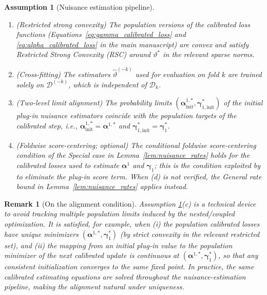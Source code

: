 \documentclass{article}
\newtheorem{assumption}{Assumption}[section]
\newtheorem{remark}{Remark}[section]
\begin{document}
\begin{assumption}[Nuisance estimation pipeline]\label{asmp:rsc}
\begin{enumerate}[label={(\alph*)},leftmargin=*]
    \item (Restricted strong convexity) The population versions of the calibrated loss functions (Equations~\eqref{eq:gamma_calibrated_loss} and \eqref{eq:alpha_calibrated_loss} in the main manuscript) are convex and satisfy Restricted Strong Convexity (RSC) around $\vartheta^*$ in the relevant sparse norms.
    \item (Cross-fitting) The estimators $\widehat{\vartheta}^{(-k)}$ used for evaluation on fold $k$ are trained solely on $\mathcal{D}^{(-k)}$, which is independent of $\mathcal{D}_k$.
    \item (Two-level limit alignment) The probability limits $(\boldsymbol{\alpha}^{1,*}_{\mathrm{init}},\boldsymbol{\gamma}^{*}_{1,\mathrm{init}})$ of the initial plug-in nuisance estimators coincide with the population targets of the calibrated step, i.e., $\boldsymbol{\alpha}^{1,*}_{\mathrm{init}}=\boldsymbol{\alpha}^{1,*}$ and $\boldsymbol{\gamma}^{*}_{1,\mathrm{init}}=\boldsymbol{\gamma}^{*}_{1}$.
    \item (Foldwise score-centering; optional) The conditional foldwise score-centering condition of the \emph{Special} case in Lemma~\ref{lem:nuisance_rates} holds for the calibrated losses used to estimate $\boldsymbol{\alpha}^1$ and $\boldsymbol{\gamma}_1$; this is the condition exploited by \citet{hou2025efficient} to eliminate the plug-in score term. When (d) is not verified, the \emph{General} rate bound in Lemma~\ref{lem:nuisance_rates} applies instead.
\end{enumerate}
\end{assumption}

\begin{remark}[On the alignment condition]\label{rem:alignment}
Assumption \ref{asmp:rsc}(c) is a technical device to avoid tracking multiple population limits induced by the nested/coupled optimization. It is satisfied, for example, when (i) the population calibrated losses have unique minimizers $(\boldsymbol{\alpha}^{1,*},\boldsymbol{\gamma}_1^*)$ (by strict convexity in the relevant restricted set), and (ii) the mapping from an initial plug-in value to the population minimizer of the next calibrated update is continuous at $(\boldsymbol{\alpha}^{1,*},\boldsymbol{\gamma}_1^*)$, so that any consistent initialization converges to the same fixed point. In practice, the same calibrated estimating equations are solved throughout the nuisance-estimation pipeline, making the alignment natural under uniqueness.
\end{remark}
\end{document}
